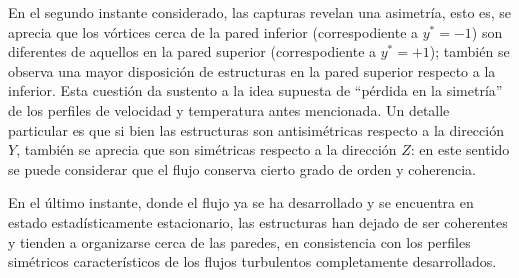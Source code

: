 En el segundo instante considerado, las capturas revelan una asimetría, esto es, se aprecia que los vórtices cerca de la pared inferior (correspodiente a $y^*=-1$) son diferentes de aquellos en la pared superior (correspodiente a $y^*=+1$); también se observa una mayor disposición de estructuras en la pared superior respecto a la inferior. Esta cuestión da sustento a la idea supuesta de ``pérdida en la simetría'' de los perfiles de velocidad y temperatura antes mencionada. Un detalle particular es que si bien las estructuras son antisimétricas respecto a la dirección $Y$, también se aprecia que son simétricas respecto a la dirección $Z$: en este sentido se puede considerar que el flujo conserva cierto grado de orden y coherencia. 

En el último instante, donde el flujo ya se ha desarrollado y se encuentra en estado estadísticamente estacionario, las estructuras han dejado de ser coherentes y tienden a organizarse cerca de las paredes, en consistencia con los perfiles simétricos característicos de los flujos turbulentos completamente desarrollados.

